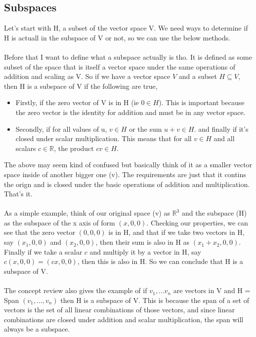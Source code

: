 \documentclass{report}
\begin{document}
\begin{multicols}{2}
\section{Subspaces}%
\label{sec: Subspaces }
Let's start with H, a subset of the vector space V. We need ways to determine if H is actuall in the subspace of V or not, so we can use the below methods. \\\\
Before that I want to define what a subspace actually is tho. It is defined as some subset of the space that is itself a vector space under the same operations of addition and scaling as V. So if we have a vector space $ V $ and a subset $ H \subseteq V $, then H is a subspace of V if the following are true,
\begin{itemize}
	\item Firstly, if the zero vector of V is in H (ie $ 0 \in H $). This is important because the zero vector is the identity for addition and must be in any vector space.
	\item Secondly, if for all values of u, $ v \in H $ or the sum $ u+v \in H $. 
	\itme and finally if it's closed under scalar multiplication. This means that for all $ v \in H $ and all scalars $ c \in \mathbb{R} $, the product $ cv \in H $.
\end{itemize}
The above may seem kind of confused but basically think of it as a smaller vector space inside of another bigger one (v). The requirements are just that it contins the orign and is closed under the basic operations of addition and multiplication. That's it. \\\\
As a simple example, think of our original space (v) as $ \mathbb{R}^{ 3 } $ and the subspace (H) as the subspace of the x axis of form $ \left( x,0,0 \right)  $. Checking our properties, we can see that the zero vector $ \left( 0,0,0 \right)  $ is in H, and that if we take two vectors in H, say $ \left( x_1,0,0 \right)  $ and $ \left( x_2,0,0 \right)  $, then their sum is also in H as $ \left( x_1+x_2,0,0 \right)  $. Finally if we take a scalar $ c $ and multiply it by a vector in H, say $ c\left( x,0,0 \right)  = \left( cx,0,0 \right)  $, then this is also in H. So we can conclude that H is a subspace of V. \\\\ 
The concept review also gives the example of if $ v_1, \ldots v_n $ are vectors in V and H = Span $ \left( v_1,\ldots,v_n \right)  $ then H is a subspace of V. This is because the span of a set of vectors is the set of all linear combinations of those vectors, and since linear combinations are closed under addition and scalar multiplication, the span will always be a subspace. \\\\

\end{multicols}
\end{document}
